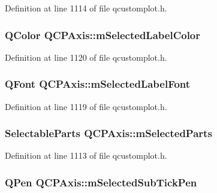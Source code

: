 Definition at line 1114 of file qcustomplot.\-h.

\hypertarget{class_q_c_p_axis_a94f57de3ba024471ca206d83cf2258dd}{
\subsubsection[{m\-Selected\-Label\-Color}]{\setlength{\rightskip}{0pt plus 5cm}Q\-Color Q\-C\-P\-Axis\-::m\-Selected\-Label\-Color\hspace{0.3cm}{\ttfamily [protected]}}}\label{class_q_c_p_axis_a94f57de3ba024471ca206d83cf2258dd}


Definition at line 1120 of file qcustomplot.\-h.

\hypertarget{class_q_c_p_axis_ae48fe3489afadc0b3cd003233e2bf19f}{
\subsubsection[{m\-Selected\-Label\-Font}]{\setlength{\rightskip}{0pt plus 5cm}Q\-Font Q\-C\-P\-Axis\-::m\-Selected\-Label\-Font\hspace{0.3cm}{\ttfamily [protected]}}}\label{class_q_c_p_axis_ae48fe3489afadc0b3cd003233e2bf19f}


Definition at line 1119 of file qcustomplot.\-h.

\hypertarget{class_q_c_p_axis_a8f1eb0abfe2ae64652aa46b360e841e4}{
\subsubsection[{m\-Selected\-Parts}]{\setlength{\rightskip}{0pt plus 5cm}Selectable\-Parts Q\-C\-P\-Axis\-::m\-Selected\-Parts\hspace{0.3cm}{\ttfamily [protected]}}}\label{class_q_c_p_axis_a8f1eb0abfe2ae64652aa46b360e841e4}


Definition at line 1113 of file qcustomplot.\-h.

\hypertarget{class_q_c_p_axis_aa5cc6afc5dc2a365f5abbd36eb04a1dc}{
\subsubsection[{m\-Selected\-Sub\-Tick\-Pen}]{\setlength{\rightskip}{0pt plus 5cm}Q\-Pen Q\-C\-P\-Axis\-::m\-Selected\-Sub\-Tick\-Pen\hspace{0.3cm}{\ttfamily [protected]}}}\label{class_q_c_p_axis_aa5cc6afc5dc2a365f5abbd36eb04a1dc}


